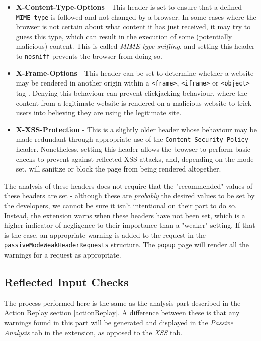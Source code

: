 \begin{itemize}
	\item \textbf{X-Content-Type-Options} - This header is set to ensure that a defined \texttt{MIME-type} is followed and not changed by a browser. In some cases where the browser is not certain about what content it has just received, it may try to guess this type, which can result in the execution of some (potentially malicious) content. This is called \textit{MIME-type sniffing}, and setting this header to \texttt{nosniff} prevents the browser from doing so.
	
	\item \textbf{X-Frame-Options} - This header can be set to determine whether a website may be rendered in another origin within a \texttt{<frame>}, \texttt{<iframe>} or \texttt{<object>} tag \cite{xFrameOptions}. Denying this behaviour can prevent clickjacking behaviour, where the content from a legitimate website is rendered on a malicious website to trick users into believing they are using the legitimate site.
	
	\item \textbf{X-XSS-Protection} - This is a slightly older header whose behaviour may be made redundant through appropriate use of the \texttt{Content-Security-Policy} header. Nonetheless, setting this header allows the browser to perform basic checks to prevent against reflected XSS attacks, and, depending on the mode set, will sanitize or block the page from being rendered altogether.
	
\end{itemize}

The analysis of these headers does not require that the "recommended" values of these headers are set - although these are \textit{probably} the desired values to be set by the developers, we cannot be sure it isn't intentional on their part to do so. Instead, the extension warns when these headers have not been set, which is a higher indicator of negligence to their importance than a "weaker" setting. If that is the case, an appropriate warning is added to the request in the \texttt{passiveModeWeakHeaderRequests} structure. The \texttt{popup} page will render all the warnings for a request as appropriate. 

\subsection{Reflected Input Checks} \label{reflectedInputChecks}

The process performed here is the same as the analysis part described in the Action Replay section \ref{actionReplay}. A difference between these is that any warnings found in this part will be generated and displayed in the \textit{Passive Analysis} tab in the extension, as opposed to the \textit{XSS} tab.

